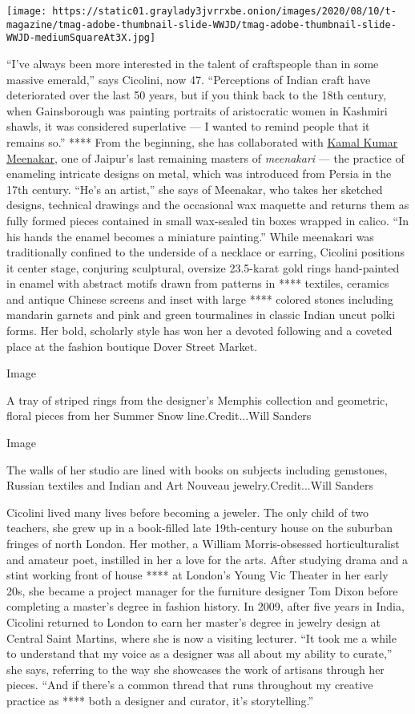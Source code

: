\texttt{[image: https://static01.graylady3jvrrxbe.onion/images/2020/08/10/t-magazine/tmag-adobe-thumbnail-slide-WWJD/tmag-adobe-thumbnail-slide-WWJD-mediumSquareAt3X.jpg]}

``I've always been more interested in the talent of craftspeople than in
some massive emerald,'' says Cicolini, now 47. ``Perceptions of Indian
craft have deteriorated over the last 50 years, but if you think back to
the 18th century, when Gainsborough was painting portraits of
aristocratic women in Kashmiri shawls, it was considered superlative ---
I wanted to remind people that it remains so.'' **** From the beginning,
she has collaborated with
\href{https://www.nytimes3xbfgragh.onion/2015/05/14/fashion/jewelry-an-antique-enamel-technique-from-persia.html}{Kamal
Kumar Meenakar}, one of Jaipur's last remaining masters of
\emph{meenakari} --- the practice of enameling intricate designs on
metal, which was introduced from Persia in the 17th century. ``He's an
artist,'' she says of Meenakar, who takes her sketched designs,
technical drawings and the occasional wax maquette and returns them as
fully formed pieces contained in small wax-sealed tin boxes wrapped in
calico. ``In his hands the enamel becomes a miniature painting.'' While
meenakari was traditionally confined to the underside of a necklace or
earring, Cicolini positions it center stage, conjuring sculptural,
oversize 23.5-karat gold rings hand-painted in enamel with abstract
motifs drawn from patterns in **** textiles, ceramics and antique
Chinese screens and inset with large **** colored stones including
mandarin garnets and pink and green tourmalines in classic Indian uncut
polki forms. Her bold, scholarly style has won her a devoted following
and a coveted place at the fashion boutique Dover Street Market.

Image

A tray of striped rings from the designer's Memphis collection and
geometric, floral pieces from her Summer Snow line.Credit...Will Sanders

Image

The walls of her studio are lined with books on subjects including
gemstones, Russian textiles and Indian and Art Nouveau
jewelry.Credit...Will Sanders

Cicolini lived many lives before becoming a jeweler. The only child of
two teachers, she grew up in a book-filled late 19th-century house on
the suburban fringes of north London. Her mother, a William
Morris-obsessed horticulturalist and amateur poet, instilled in her a
love for the arts. After studying drama and a stint working front of
house **** at London's Young Vic Theater in her early 20s, she became a
project manager for the furniture designer Tom Dixon before completing a
master's degree in fashion history. In 2009, after five years in India,
Cicolini returned to London to earn her master's degree in jewelry
design at Central Saint Martins, where she is now a visiting lecturer.
``It took me a while to understand that my voice as a designer was all
about my ability to curate,'' she says, referring to the way she
showcases the work of artisans through her pieces. ``And if there's a
common thread that runs throughout my creative practice as **** both a
designer and curator, it's storytelling.''

